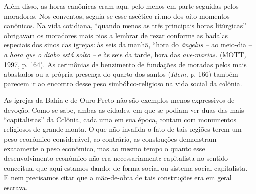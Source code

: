 Além disso, as horas canônicas eram aqui pelo menos em parte seguidas
pelos moradores. Nos conventos, seguia-se esse ascético ritmo dos oito
momentos canônicos. Na vida cotidiana, ``quando menos as três principais
horas litúrgicas'' obrigavam os moradores mais pios a lembrar de rezar
conforme as badalas especiais dos sinos das igrejas: às seis da manhã,
``hora do \emph{ângelus --} ao meio-dia -- \emph{a} \emph{hora que o
diabo está solto --} e às seis da tarde, hora das \emph{ave-marias.}
(MOTT\emph{,} 1997, p. 164). As cerimônias de benzimento de fundações de
moradas pelos mais abastados ou a própria presença do quarto dos santos
(\emph{Idem,} p. 166) também parecem ir ao encontro desse peso
simbólico-religioso na vida social da colônia.

As igrejas da Bahia e de Ouro Preto não são exemplos menos expressivos
de devoção. Como se sabe, ambas as cidades, em que se podiam ver duas
das mais ``capitalistas'' da Colônia, cada uma em sua época, contam com
monumentos religiosos de grande monta. O que não invalida o fato de tais
regiões terem um peso econômico considerável, ao contrário, as
construções demonstram exatamente o peso econômico, mas ao mesmo tempo o
quanto esse desenvolvimento econômico não era necessariamente
capitalista no sentido conceitual que aqui estamos dando: de
forma-social ou sistema social capitalista. E nem precisamos citar que a
mão-de-obra de tais construções era em geral escrava.

